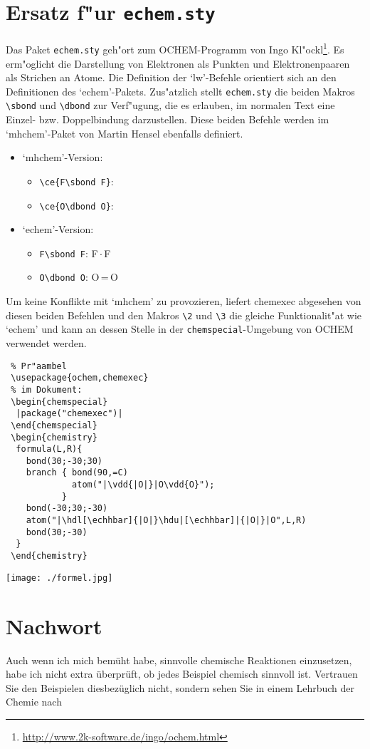 \documentclass[a4paper,10pt,headsepline]{scrartcl}
\newcommand{\CEx}[1][8]{%
{\color{dunkelrot}\fontfamily{pag}\fontsize{#1}{#1}\selectfont chemexec}\xspace
}
\begin{document}
\section{Ersatz f"ur \texttt{echem.sty}}
Das Paket \verb=echem.sty= geh"ort zum OCHEM-Programm von Ingo Kl"ockl\footnote{\url{http://www.2k-software.de/ingo/ochem.html}}. Es erm"oglicht die Darstellung von Elektronen als Punkten und Elektronenpaaren als Strichen an Atome. Die Definition der `lw'-Befehle orientiert sich an den Definitionen des `echem'-Pakets. Zus"atzlich stellt \verb=echem.sty= die beiden Makros \verb=\sbond= und \verb=\dbond= zur Verf"ugung, die es erlauben, im normalen Text eine Einzel- bzw. Doppelbindung darzustellen. Diese beiden Befehle werden im `mhchem'-Paket von Martin Hensel ebenfalls definiert.
\begin{itemize}
 \item `mhchem'-Version:
 \begin{itemize}
  \item\texttt{\textbackslash ce\{F\textbackslash sbond F\}}: 
  \item\texttt{\textbackslash ce\{O\textbackslash dbond O\}}: 
 \end{itemize}
 \item\newcommand{\sibond}{\,\ensuremath{\cdot}\,}\newcommand{\dobond}{\,=\,} `echem'-Version:
 \begin{itemize}
  \item\texttt{F\textbackslash sbond F}: F\sibond F
  \item\texttt{O\textbackslash dbond O}: O\dobond O
 \end{itemize}
\end{itemize}
Um keine Konflikte mit `mhchem' zu provozieren, liefert \CEx abgesehen von diesen beiden Befehlen und den Makros \verb=\2= und \verb=\3= die gleiche Funktionalit"at wie `echem' und kann an dessen Stelle in der \texttt{chemspecial}-Umgebung von OCHEM verwendet werden.
\begin{lstlisting}
 % Pr"aambel
 \usepackage{ochem,chemexec}
 % im Dokument:
 \begin{chemspecial}
  |package("chemexec")|
 \end{chemspecial}
 \begin{chemistry}
  formula(L,R){
    bond(30;-30;30)
    branch { bond(90,=C)
             atom("|\vdd{|O|}|O\vdd{O}");
           }
    bond(-30;30;-30)
    atom("|\hdl[\echhbar]{|O|}\hdu|[\echhbar]|{|O|}|O",L,R)
    bond(30;-30)
  }
 \end{chemistry}
\end{lstlisting}
\texttt{[image: ./formel.jpg]}%

\section{Nachwort}
Auch wenn ich mich bemüht habe, sinnvolle chemische Reaktionen einzusetzen, habe ich nicht extra überprüft, ob jedes Beispiel chemisch sinnvoll ist. Vertrauen Sie den Beispielen diesbezüglich nicht, sondern sehen Sie in einem Lehrbuch der Chemie nach
\end{document}
